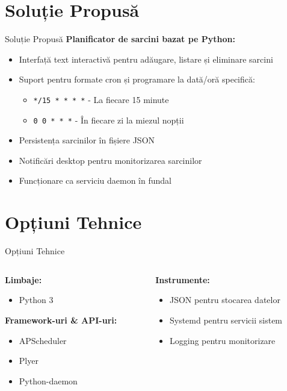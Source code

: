 \documentclass[aspectratio=169]{beamer}
\begin{document}
\section{Soluție Propusă}
\begin{frame}{Soluție Propusă}
  \textbf{Planificator de sarcini bazat pe Python:}
  \begin{itemize}
    \item Interfață text interactivă pentru adăugare, listare și eliminare sarcini
    \item Suport pentru formate cron și programare la dată/oră specifică:
    \begin{itemize}
      \item \texttt{*/15 * * * *} - La fiecare 15 minute
      \item \texttt{0 0 * * *} - În fiecare zi la miezul nopții
    \end{itemize}
    \item Persistența sarcinilor în fișiere JSON
    \item Notificări desktop pentru monitorizarea sarcinilor
    \item Funcționare ca serviciu daemon în fundal
  \end{itemize}
\end{frame}

\section{Opțiuni Tehnice}
\begin{frame}{Opțiuni Tehnice}
  \begin{columns}
    \begin{column}{0.5\textwidth}
      \textbf{Limbaje:}
      \begin{itemize}
        \item Python 3
      \end{itemize}
      
      \textbf{Framework-uri \& API-uri:}
      \begin{itemize}
        \item APScheduler
        \item Plyer
        \item Python-daemon
      \end{itemize}
    \end{column}
    \begin{column}{0.5\textwidth}
      \textbf{Instrumente:}
      \begin{itemize}
        \item JSON pentru stocarea datelor
        \item Systemd pentru servicii sistem
        \item Logging pentru monitorizare
      \end{itemize}
    \end{column}
  \end{columns}
\end{frame}
\end{document}
